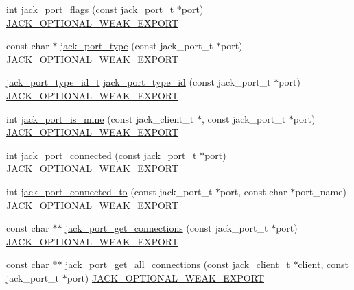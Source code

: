 \begin{DoxyCompactItemize}
int \hyperlink{group__PortFunctions_ga2c9ed0ee016e19070b2e42f7f0a12b95}{jack\-\_\-port\-\_\-flags} (const jack\-\_\-port\-\_\-t $\ast$port) \hyperlink{weakmacros_8h_adf1bde0dd996bbf61a44311165014dd1}{\-J\-A\-C\-K\-\_\-\-O\-P\-T\-I\-O\-N\-A\-L\-\_\-\-W\-E\-A\-K\-\_\-\-E\-X\-P\-O\-R\-T}
\item 
const char $\ast$ \hyperlink{group__PortFunctions_gae2b2ef9ef3ba606be342a7d2c292cb00}{jack\-\_\-port\-\_\-type} (const jack\-\_\-port\-\_\-t $\ast$port) \hyperlink{weakmacros_8h_adf1bde0dd996bbf61a44311165014dd1}{\-J\-A\-C\-K\-\_\-\-O\-P\-T\-I\-O\-N\-A\-L\-\_\-\-W\-E\-A\-K\-\_\-\-E\-X\-P\-O\-R\-T}
\item 
\hyperlink{types_8h_aaa73ac8abfc0f11db61444f9a4812e42}{jack\-\_\-port\-\_\-type\-\_\-id\-\_\-t} \hyperlink{group__PortFunctions_ga443f950e5fe4dd3ba9e1f4530bb172a4}{jack\-\_\-port\-\_\-type\-\_\-id} (const jack\-\_\-port\-\_\-t $\ast$port) \hyperlink{weakmacros_8h_adf1bde0dd996bbf61a44311165014dd1}{\-J\-A\-C\-K\-\_\-\-O\-P\-T\-I\-O\-N\-A\-L\-\_\-\-W\-E\-A\-K\-\_\-\-E\-X\-P\-O\-R\-T}
\item 
int \hyperlink{group__PortFunctions_ga2935e21ef49da7a420aca8cd25e179e6}{jack\-\_\-port\-\_\-is\-\_\-mine} (const jack\-\_\-client\-\_\-t $\ast$, const jack\-\_\-port\-\_\-t $\ast$port) \hyperlink{weakmacros_8h_adf1bde0dd996bbf61a44311165014dd1}{\-J\-A\-C\-K\-\_\-\-O\-P\-T\-I\-O\-N\-A\-L\-\_\-\-W\-E\-A\-K\-\_\-\-E\-X\-P\-O\-R\-T}
\item 
int \hyperlink{group__PortFunctions_gafa704768d67d1a30f263a9384d845b14}{jack\-\_\-port\-\_\-connected} (const jack\-\_\-port\-\_\-t $\ast$port) \hyperlink{weakmacros_8h_adf1bde0dd996bbf61a44311165014dd1}{\-J\-A\-C\-K\-\_\-\-O\-P\-T\-I\-O\-N\-A\-L\-\_\-\-W\-E\-A\-K\-\_\-\-E\-X\-P\-O\-R\-T}
\item 
int \hyperlink{group__PortFunctions_ga996d8f5176b87bb8d333208468b6af12}{jack\-\_\-port\-\_\-connected\-\_\-to} (const jack\-\_\-port\-\_\-t $\ast$port, const char $\ast$port\-\_\-name) \hyperlink{weakmacros_8h_adf1bde0dd996bbf61a44311165014dd1}{\-J\-A\-C\-K\-\_\-\-O\-P\-T\-I\-O\-N\-A\-L\-\_\-\-W\-E\-A\-K\-\_\-\-E\-X\-P\-O\-R\-T}
\item 
const char $\ast$$\ast$ \hyperlink{group__PortFunctions_gac1c942d03daee62ac6d0ed0ad044de43}{jack\-\_\-port\-\_\-get\-\_\-connections} (const jack\-\_\-port\-\_\-t $\ast$port) \hyperlink{weakmacros_8h_adf1bde0dd996bbf61a44311165014dd1}{\-J\-A\-C\-K\-\_\-\-O\-P\-T\-I\-O\-N\-A\-L\-\_\-\-W\-E\-A\-K\-\_\-\-E\-X\-P\-O\-R\-T}
\item 
const char $\ast$$\ast$ \hyperlink{group__PortFunctions_ga4e1bd29a68acb4fb45f75931de0d36b2}{jack\-\_\-port\-\_\-get\-\_\-all\-\_\-connections} (const jack\-\_\-client\-\_\-t $\ast$client, const jack\-\_\-port\-\_\-t $\ast$port) \hyperlink{weakmacros_8h_adf1bde0dd996bbf61a44311165014dd1}{\-J\-A\-C\-K\-\_\-\-O\-P\-T\-I\-O\-N\-A\-L\-\_\-\-W\-E\-A\-K\-\_\-\-E\-X\-P\-O\-R\-T}

\end{DoxyCompactItemize}
